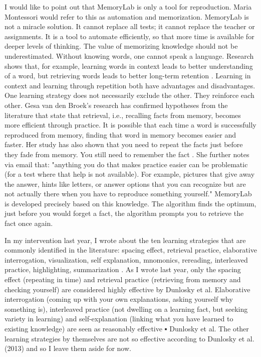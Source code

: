 \documentclass[12pt, a4paper]{article}
\begin{document}
I would like to point out that MemoryLab is only a tool for reproduction. Maria Montessori would refer to this as automation and memorization. MemoryLab is not a miracle solution. It cannot replace all tests; it cannot replace the teacher or assignments. It is a tool to automate efficiently, so that more time is available for deeper levels of thinking. The value of memorizing knowledge should not be underestimated. Without knowing words, one cannot speak a language. Research shows that, for example, learning words in context leads to better understanding of a word, but retrieving words leads to better long-term retention \cite[]{gesa}. Learning in context and learning through repetition both have advantages and disadvantages. One learning strategy does not necessarily exclude the other. They reinforce each other. Gesa van den Broek's research has confirmed hypotheses from the literature that state that retrieval, i.e., recalling facts from memory, becomes more efficient through practice. It is possible that each time a word is successfully reproduced from memory, finding that word in memory becomes easier and faster. Her study has also shown that you need to repeat the facts just before they fade from memory. You still need to remember the fact \cite[]{gesa2}. She further notes via email that: "anything you do that makes practice easier can be problematic (for a test where that help is not available). For example, pictures that give away the answer, hints like letters, or answer options that you can recognize but are not actually there when you have to reproduce something yourself." MemoryLab is developed precisely based on this knowledge. The algorithm finds the optimum, just before you would forget a fact, the algorithm prompts you to retrieve the fact once again.

In my intervention last year, I wrote about the ten learning strategies that are commonly identified in the literature: spacing effect, retrieval practice, elaborative interrogation, visualization, self explanation, mnomonics, rereading, interleaved practice, highlighting, summarization \cite[p.13-14]{Marijn23}. As I wrote last year, only the spacing effect (repeating in time) and retrieval practice (retrieving from memory and checking yourself) are considered highly effective by Dunlosky et al. Elaborative interrogation (coming up with your own explanations, asking yourself why something is), interleaved practice (not dwelling on a learning fact, but seeking variety in learning) and self-explanation (linking what you have learned to existing knowledge) are seen as reasonably effective ▪ Dunlosky et al. The other learning strategies by themselves are not so effective according to Dunlosky et al. (2013) and so I leave them aside for now.
\end{document}
